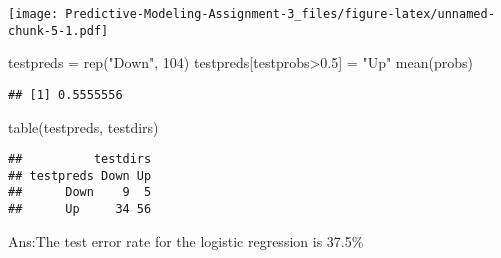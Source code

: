 \documentclass[
]{article}
\newenvironment{Shaded}{\begin{snugshade}}{\end{snugshade}}
\newcommand{\AttributeTok}[1]{\textcolor[rgb]{0.77,0.63,0.00}{#1}}
\newcommand{\DecValTok}[1]{\textcolor[rgb]{0.00,0.00,0.81}{#1}}
\newcommand{\FloatTok}[1]{\textcolor[rgb]{0.00,0.00,0.81}{#1}}
\newcommand{\FunctionTok}[1]{\textcolor[rgb]{0.00,0.00,0.00}{#1}}
\newcommand{\NormalTok}[1]{#1}
\newcommand{\OtherTok}[1]{\textcolor[rgb]{0.56,0.35,0.01}{#1}}
\newcommand{\SpecialCharTok}[1]{\textcolor[rgb]{0.00,0.00,0.00}{#1}}
\newcommand{\StringTok}[1]{\textcolor[rgb]{0.31,0.60,0.02}{#1}}
\begin{document}
\begin{Shaded}
\end{Shaded}

\texttt{[image: Predictive-Modeling-Assignment-3\_files/figure-latex/unnamed-chunk-5-1.pdf]}

\begin{Shaded}
\begin{Highlighting}[]
\NormalTok{testpreds }\OtherTok{=} \FunctionTok{rep}\NormalTok{(}\StringTok{"Down"}\NormalTok{, }\DecValTok{104}\NormalTok{)}
\NormalTok{testpreds[testprobs}\SpecialCharTok{\textgreater{}}\FloatTok{0.5}\NormalTok{] }\OtherTok{=} \StringTok{"Up"}
\FunctionTok{mean}\NormalTok{(probs)}
\end{Highlighting}
\end{Shaded}

\begin{verbatim}
## [1] 0.5555556
\end{verbatim}

\begin{Shaded}
\begin{Highlighting}[]
\FunctionTok{table}\NormalTok{(testpreds, testdirs)}
\end{Highlighting}
\end{Shaded}

\begin{verbatim}
##          testdirs
## testpreds Down Up
##      Down    9  5
##      Up     34 56
\end{verbatim}

Ans:The test error rate for the logistic regression is 37.5\%
\end{document}
